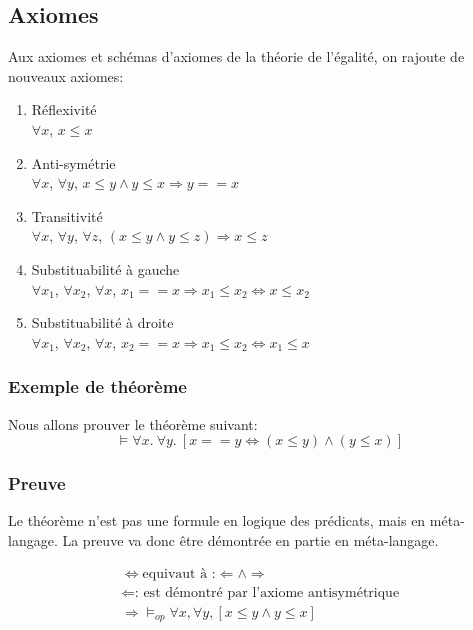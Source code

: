 {\subsection{Axiomes} 

Aux axiomes et schémas d'axiomes de la théorie de l'égalité, on rajoute de nouveaux axiomes:
\begin{enumerate}
\item Réflexivité \\$\forall x$, $x\leq x$
\item Anti-symétrie \\$\forall x$, $\forall y$, $ x\leq y \land y\leq x\Rightarrow y==x$
\item Transitivité \\$\forall x$, $\forall y$, $\forall z$, $(x\leq y \land y\leq z) \Rightarrow x\leq z$
\item Substituabilité à gauche \\$\forall x_{1}$, $\forall x_{2}$, $\forall x$,  $x_{1}==x \Rightarrow x_{1}\leq x_{2} \Leftrightarrow x \leq x_{2}$
\item Substituabilité à droite \\$\forall x_{1}$, $\forall x_{2}$, $\forall x$,  $x_{2}==x \Rightarrow x_{1}\leq x_{2} \Leftrightarrow x_{1} \leq x$
\end{enumerate}

\subsubsection{Exemple de théorème}

Nous allons prouver le théorème suivant:
$$\models \forall x.\ \forall y.\  [x==y \Leftrightarrow (x\leq y)\land (y \leq x)] $$

\subsubsection{Preuve}

Le théorème n'est pas une formule en logique des prédicats, mais en méta-langage.
La preuve va donc être démontrée en partie en méta-langage.

\begin{align*}
\Leftrightarrow \text{equivaut à :} \Leftarrow \land \Rightarrow \\
\Leftarrow \text{: est démontré par l'axiome antisymétrique} \\	
\Rightarrow \models_{op} \forall x, \forall y, [x\leq y \land y \leq x] 
\end{align*}

}
